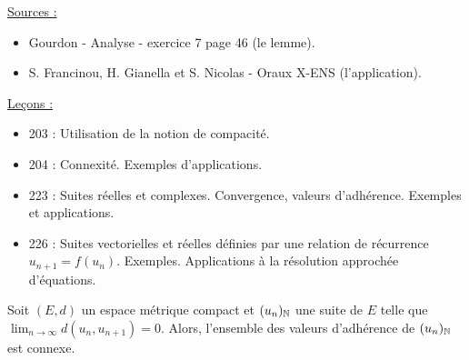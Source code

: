 
\usetikzlibrary{patterns,arrows.meta}

\pagestyle{fancy}

\fancyhead[R]{}



\underline{Sources :} 
\begin{itemize}
\item Gourdon - Analyse - exercice 7 page 46 (le lemme).
\item S. Francinou, H. Gianella et S. Nicolas - Oraux X-ENS (l'application).
\end{itemize}

\underline{Leçons :}
\begin{itemize}

\item 203 : Utilisation de la notion de compacité.
\item 204 : Connexité. Exemples d’applications.
\item 223 : Suites réelles et complexes. Convergence, valeurs d’adhérence. Exemples et applications.
\item 226 : Suites vectorielles et réelles définies par une relation de récurrence $u_{n+1}=f(u_n)$. Exemples. 
Applications à la résolution approchée d’équations.

\end{itemize}

\begin{lem}
Soit $(E,d)$ un espace métrique compact et $(u_n)_{\mathbb{N}}$ une suite de $E$ telle que $\lim_{n\to\infty} d(u_n,u_{n+1}) = 0$.
Alors, l'ensemble des valeurs d'adhérence de $(u_n)_{\mathbb{N}}$ est connexe.
\end{lem}


